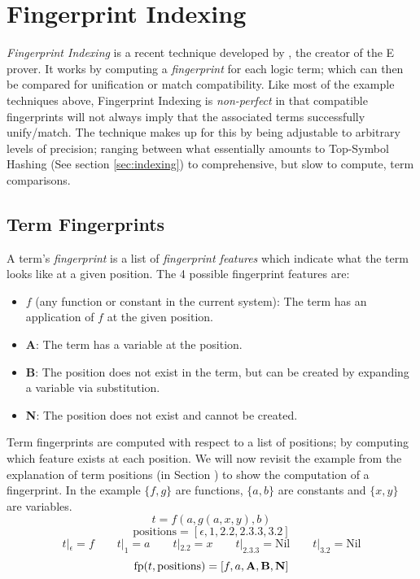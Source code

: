 \section{Fingerprint Indexing}
\label{sec:fingerprint}

\emph{Fingerprint Indexing} is a recent technique developed by , the creator
of the E prover. It works by computing a \emph{fingerprint} for each logic term;
which can then be compared for unification or match compatibility. 
Like most of the example techniques above,
Fingerprint Indexing is \emph{non-perfect} in that compatible fingerprints will not
always imply that the associated terms successfully unify/match. The technique
makes up for this by being adjustable to arbitrary levels of precision; ranging between
what essentially amounts to Top-Symbol Hashing (See section \ref{sec:indexing})
to comprehensive, but slow to compute, term comparisons.

\subsection{Term Fingerprints}
\label{sec:fingerprints}

A term's \emph{fingerprint} is a list of \emph{fingerprint features} which
indicate what the term looks like at a given position. The 4 possible
fingerprint features are:
\begin{itemize}
\item $f$ (any function or constant in the current system): The term has an application of $f$ at the given position.
\item \textbf{A}: The term has a variable at the position.
\item \textbf{B}: The position does not exist in the term, but can be created
by expanding a variable via substitution.
\item \textbf{N}: The position does not exist and cannot be created.
\end{itemize}
Term fingerprints are computed with respect to a list of positions; by
computing which feature exists at each position. We will now revisit the example from
the explanation of term positions (in Section \label{sec:terminology}) to show
the computation of a fingerprint. In the example $\{f,g\}$ are functions, $\{a,b\}$ are
constants and $\{x,y\}$ are variables.
\[t = f(a, g(a, x, y), b)\]
\[\text{positions} = [\epsilon, 1, 2.2, 2.3.3, 3.2] \]
\[t|_{\epsilon} = f \quad\quad t|_{1} = a \quad\quad  t|_{2.2} = x \quad\quad  t|_{2.3.3} = \text{Nil} \quad\quad  t|_{3.2} = \text{Nil}\]
\[\text{fp}(t, \text{positions}) = [f, a, \textbf{A}, \textbf{B}, \textbf{N}] \]

